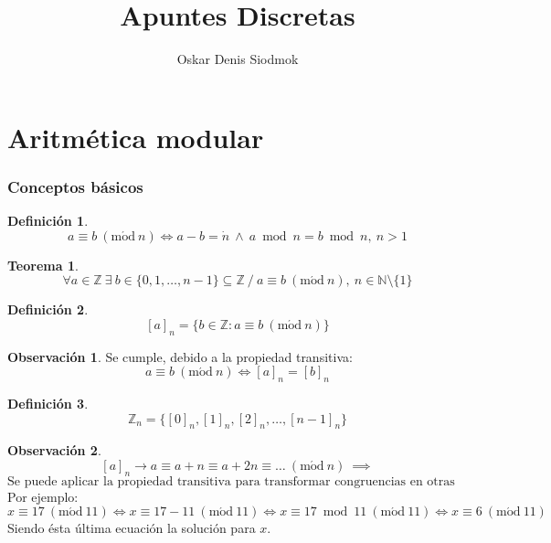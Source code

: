 \documentclass[10pt,a4paper]{article}
\title{Apuntes Discretas}
\author{Oskar Denis Siodmok}
\theoremstyle{definition}
\newtheorem{definition}{Definición}[section]
\newtheorem{theorem}{Teorema}[section]
\newtheorem{obs}{Observación}[section]
\newcommand{\Mod}[1]{\ (\mathrm{m\acute od}\ #1)}
\begin{document}
\maketitle
\part{Aritmética modular}
\section{Conceptos básicos}
\begin{definition}
\[a\equiv b \Mod{n} \iff a-b = \dot{n} \:\land\: a\bmod n = b\bmod n,\: n>1\]
\end{definition}

\begin{theorem}
\[\forall a \in\mathbb{Z}\:\exists\:b\in\{0,1,\dots,n-1\}\subseteq\mathbb{Z}\:/\:a\equiv b\Mod{n},\:n\in\mathbb{N}\setminus\{1\}\]
\end{theorem}

\begin{definition}
\[[a]_n = \{b\in\mathbb{Z}:a\equiv b\Mod{n}\}\]
\end{definition}

\begin{obs}
Se cumple, debido a la propiedad transitiva: 
\[a\equiv b\Mod{n}\iff[a]_n = [b]_n\]
\end{obs}

\begin{definition}
	\[\mathbb{Z}_n=\{[0]_n,[1]_n,[2]_n,\dots,[n-1]_n\}\]
\end{definition}

\begin{obs}
	\[[a]_n \longrightarrow a \equiv a+n \equiv a+2n \equiv \dots \Mod{n}\:\implies\]
\[\text{Se puede aplicar la propiedad transitiva para transformar congruencias en otras equivalentes más sencillas}\]
Por ejemplo:
\[x\equiv17\Mod{11}\iff x\equiv 17-11\Mod{11} \iff x\equiv 17\bmod 11\Mod{11}\iff x\equiv 6\Mod{11}\]
Siendo ésta última ecuación la solución para $x$.
\end{obs}
\end{document}

